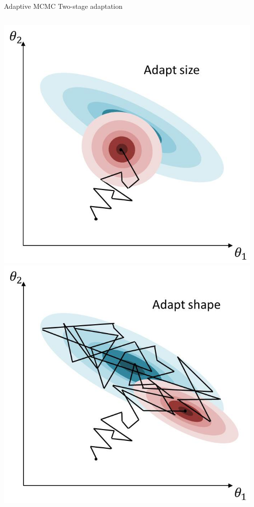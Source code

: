 \documentclass[compress]{beamer}
\begin{document}
\begin{frame}[label=sec-8-7]{Adaptive MCMC}
Two-stage adaptation
\begin{columns}[c] 
\includegraphics[width=.8\linewidth]{MH7.jpg}
\includegraphics[width=.8\linewidth]{MH8.jpg}
\end{columns}
\end{frame}
\end{document}
